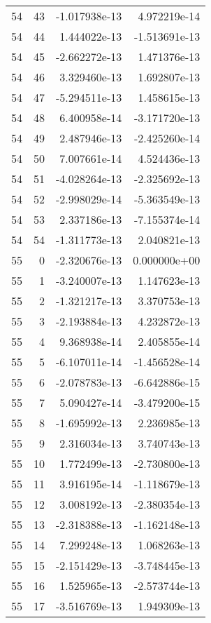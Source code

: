\begin{tabular}{rrrr}
  54 &   43 & -1.017938e-13 &  4.972219e-14 \\
  54 &   44 &  1.444022e-13 & -1.513691e-13 \\
  54 &   45 & -2.662272e-13 &  1.471376e-13 \\
  54 &   46 &  3.329460e-13 &  1.692807e-13 \\
  54 &   47 & -5.294511e-13 &  1.458615e-13 \\
  54 &   48 &  6.400958e-14 & -3.171720e-13 \\
  54 &   49 &  2.487946e-13 & -2.425260e-14 \\
  54 &   50 &  7.007661e-14 &  4.524436e-13 \\
  54 &   51 & -4.028264e-13 & -2.325692e-13 \\
  54 &   52 & -2.998029e-14 & -5.363549e-13 \\
  54 &   53 &  2.337186e-13 & -7.155374e-14 \\
  54 &   54 & -1.311773e-13 &  2.040821e-13 \\
  55 &    0 & -2.320676e-13 &  0.000000e+00 \\
  55 &    1 & -3.240007e-13 &  1.147623e-13 \\
  55 &    2 & -1.321217e-13 &  3.370753e-13 \\
  55 &    3 & -2.193884e-13 &  4.232872e-13 \\
  55 &    4 &  9.368938e-14 &  2.405855e-14 \\
  55 &    5 & -6.107011e-14 & -1.456528e-14 \\
  55 &    6 & -2.078783e-13 & -6.642886e-15 \\
  55 &    7 &  5.090427e-14 & -3.479200e-15 \\
  55 &    8 & -1.695992e-13 &  2.236985e-13 \\
  55 &    9 &  2.316034e-13 &  3.740743e-13 \\
  55 &   10 &  1.772499e-13 & -2.730800e-13 \\
  55 &   11 &  3.916195e-14 & -1.118679e-13 \\
  55 &   12 &  3.008192e-13 & -2.380354e-13 \\
  55 &   13 & -2.318388e-13 & -1.162148e-13 \\
  55 &   14 &  7.299248e-13 &  1.068263e-13 \\
  55 &   15 & -2.151429e-13 & -3.748445e-13 \\
  55 &   16 &  1.525965e-13 & -2.573744e-13 \\
  55 &   17 & -3.516769e-13 &  1.949309e-13 \\

\end{tabular}
